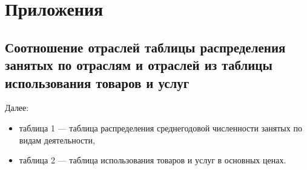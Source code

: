 \documentclass[12pt, a4paper]{article}
\begin{document}


\newpage
\section{Приложения}
\subsection{Соотношение отраслей таблицы распределения занятых по отраслям и отраслей из таблицы использования товаров и услуг}

Далее: 
\begin{itemize}\item таблица 1 --- таблица распределения среднегодовой численности занятых по видам деятельности, \item таблица 2 --- таблица использования товаров и услуг в основных ценах.\end{itemize}
\end{document}
